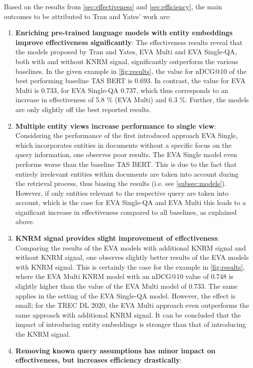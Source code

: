 Based on the results from \autoref{sec:effectiveness} and \autoref{sec:efficiency}, the main outcomes to be attributed to Tran and Yates' work are:
\begin{enumerate}
    \item \textbf{Enriching pre-trained language models with entity embeddings improve effectiveness significantly}:
    The effectiveness results reveal that the models proposed by Tran and Yates, EVA Multi and EVA Single-QA, both with and without KNRM signal, significantly outperform the various baselines. In the given example in \autoref{fig:results}, the value for nDCG@10 of the best performing baseline TAS BERT is 0.693. In contrast, the value for EVA Multi is 0.733, for EVA Single-QA 0.737, which thus corresponds to an increase in effectiveness of 5.8 \% (EVA Multi) and 6.3 \%. Further, the models are only slightly off the best reported results.
    \item \textbf{Multiple entity views increase performance to single view}:
    Considering the performance of the first introduced approach EVA Single, which incorporates entities in documents without a specific focus on the query information, one observes poor results. The EVA Single model even performs worse than the baseline TAS BERT. This is due to the fact that entirely irrelevant entities within documents are taken into account during the retrieval process, thus biasing the results (i.e. see \autoref{subsec:models}). However, if only entities relevant to the respective query are taken into account, which is the case for EVA Single-QA and EVA Multi this leads to a significant increase in effectiveness compared to all baselines, as explained above.
    \item \textbf{KNRM signal provides slight improvement of effectiveness}:
    Comparing the results of the EVA models with additional KNRM signal and without KNRM signal, one observes slightly better results of the EVA models with KNRM signal. This is certainly the case for the example in \autoref{fig:results}, where the EVA Multi KNRM model with an nDCG@10 value of 0.748 is slightly higher than the value of the EVA Multi model of 0.733. The same applies in the setting of the EVA Single-QA model. However, the effect is small; for the TREC DL 2020, the EVA Multi approach even outperforms the same approach with additional KNRM signal. It can be concluded that the impact of introducing entity embeddings is stronger than that of introducing the KNRM signal.
    \item \textbf{Removing known query assumptions has minor impact on effectiveness, but increases efficiency drastically}:

\end{enumerate}
